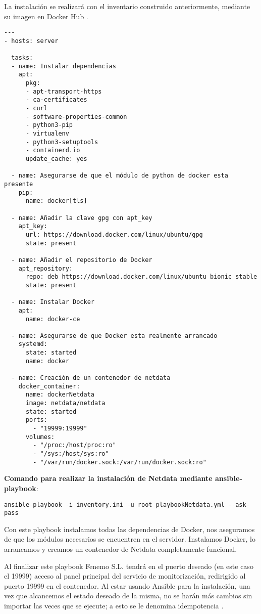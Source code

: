 \documentclass[11pt]{article}
\begin{document}
La instalación se realizará con el inventario construido anteriormente, mediante su imagen en Docker Hub \cite{netdatahub2020}.

\begin{verbatim}
---
- hosts: server

  tasks:
  - name: Instalar dependencias
    apt:
      pkg:
      - apt-transport-https
      - ca-certificates
      - curl
      - software-properties-common
      - python3-pip
      - virtualenv
      - python3-setuptools
      - containerd.io
      update_cache: yes

  - name: Asegurarse de que el módulo de python de docker esta presente
    pip:
      name: docker[tls]

  - name: Añadir la clave gpg con apt_key
    apt_key:
      url: https://download.docker.com/linux/ubuntu/gpg
      state: present

  - name: Añadir el repositorio de Docker
    apt_repository:
      repo: deb https://download.docker.com/linux/ubuntu bionic stable
      state: present

  - name: Instalar Docker
    apt:
      name: docker-ce

  - name: Asegurarse de que Docker esta realmente arrancado
    systemd:
      state: started
      name: docker

  - name: Creación de un contenedor de netdata
    docker_container:
      name: dockerNetdata
      image: netdata/netdata
      state: started
      ports:
        - "19999:19999"
      volumes:
        - "/proc:/host/proc:ro"
        - "/sys:/host/sys:ro"
        - "/var/run/docker.sock:/var/run/docker.sock:ro"
\end{verbatim}

\textbf{Comando para realizar la instalación de Netdata mediante ansible-playbook}:

\begin{verbatim}
ansible-playbook -i inventory.ini -u root playbookNetdata.yml --ask-pass
\end{verbatim}

Con este playbook instalamos todas las dependencias de Docker, nos aseguramos de que los módulos necesarios se encuentren en el servidor. Instalamos Docker, lo arrancamos y creamos un contenedor de Netdata completamente funcional.

Al finalizar este playbook Fenemo S.L. tendrá en el puerto deseado (en este caso el 19999) acceso al panel principal del servicio de monitorización, redirigido al puerto 19999 en el contenedor. Al estar usando Ansible para la instalación, una vez que alcancemos el estado deseado de la misma, no se harán más cambios sin importar las veces que se ejecute; a esto se le denomina idempotencia \cite[p. 3]{ansi2020}.
\end{document}
